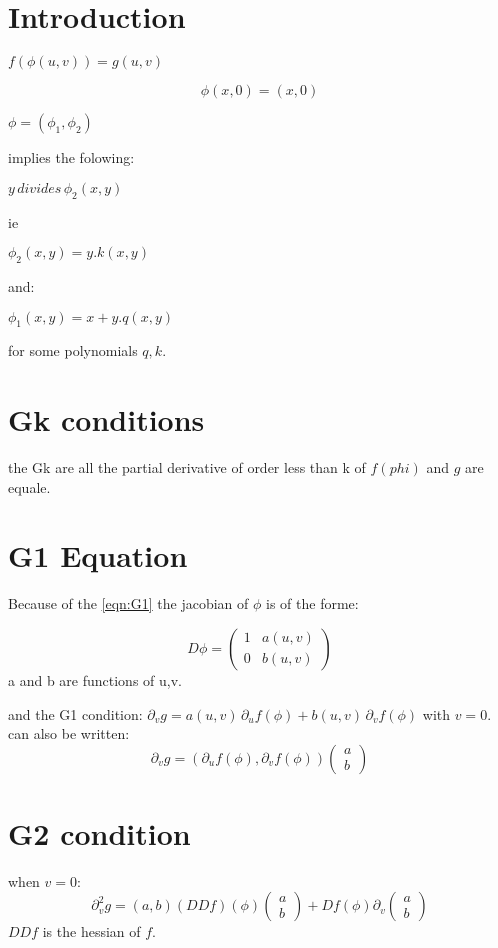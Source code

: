 \documentclass{article}
\begin{document}
\section{Introduction}
$f(\phi(u,v))=g(u,v)$

\begin{equation}
\label{eqn:G1}\phi(x,0)=(x,0)
\end{equation}

$\phi=(\phi_1,\phi_2)$

implies the folowing:

$y \,  divides \,\phi_2(x,y)$

ie

$\phi_2(x,y)=y.k(x,y)$

and:

$\phi_1(x,y)=x +y.q(x,y)$

for some polynomials $q,k$.

\section{Gk conditions}
the Gk are all the partial derivative of order less than k of $f(phi) $ and $g$ are equale.


\section{G1 Equation}

Because of the \ref{eqn:G1} the jacobian of $\phi$ is of the forme:

$$D\phi=
\begin{pmatrix}
1&a(u,v)\\
0 &b(u,v)
\end{pmatrix}
$$
a and b are functions of u,v.

and the G1 condition: $\partial _v g=a(u,v)\, \partial _u f (\phi)+b(u,v)\, \partial _v f (\phi)$  with $v=0$.
can also be written:
$$\partial _v g=(\partial _u f (\phi),\partial _v f (\phi)) \begin{pmatrix} a\\b\end{pmatrix}$$

\section{G2 condition}
when $ v=0$:
$$\partial ^2_vg=(a,b)(DDf)(\phi)\begin{pmatrix} a\\b\end{pmatrix}+Df(\phi) \partial_v\begin{pmatrix} a\\b\end{pmatrix}$$
$DDf $ is the hessian of $f$.
\end{document}
